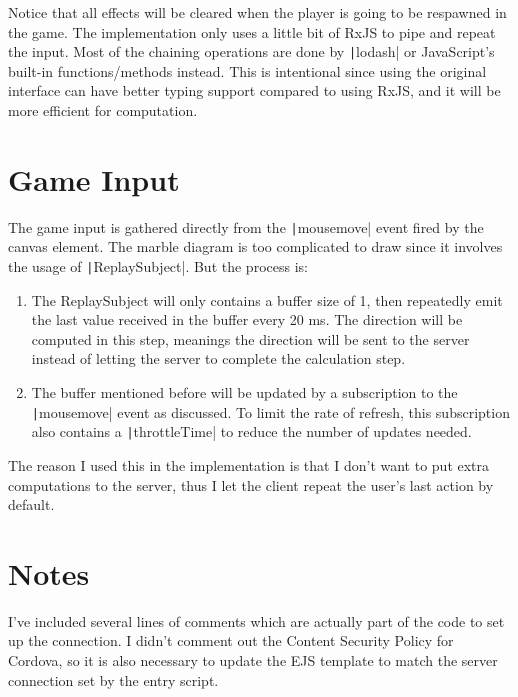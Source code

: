 \documentclass[12pt]{article}
\begin{document}
Notice that all effects will be cleared when the player is going to be respawned in the game. The implementation only uses a little bit of RxJS to pipe and repeat the input. Most of the chaining operations are done by \texttt|lodash| or JavaScript's built-in functions/methods instead. This is intentional since using the original interface can have better typing support compared to using RxJS, and it will be more efficient for computation.

\section{Game Input}

The game input is gathered directly from the \texttt|mousemove| event fired by the canvas element. The marble diagram is too complicated to draw since it involves the usage of \texttt|ReplaySubject|. But the process is:

\begin{enumerate}
  \item The ReplaySubject will only contains a buffer size of 1, then repeatedly emit the last value received in the buffer every 20 ms. The direction will be computed in this step, meanings the direction will be sent to the server instead of letting the server to complete the calculation step.
  \item The buffer mentioned before will be updated by a subscription to the \texttt|mousemove| event as discussed. To limit the rate of refresh, this subscription also contains a \texttt|throttleTime| to reduce the number of updates needed.
\end{enumerate}

The reason I used this in the implementation is that I don't want to put extra computations to the server, thus I let the client repeat the user's last action by default.

\section{Notes}

I've included several lines of comments which are actually part of the code to set up the connection. I didn't comment out the Content Security Policy for Cordova, so it is also necessary to update the EJS template to match the server connection set by the entry script.
\end{document}
